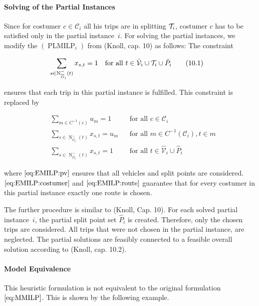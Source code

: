 \paragraph{Solving of the Partial Instances} \parfill

Since for costumer $c\in\mathcal{C}_i$ all his trips are in splitting $\mathcal{T}_i$, costumer $c$ has to be satisfied only in the partial instance~$i$. For solving the partial instances, we modify the $(\operatorname{PLMILP}_i)$ from (Knoll, cap. 10) as follows: The constraint 

\begin{align}
	\sum_{s\in\operatorname{N}_{\overline{G}_i}^-(t)} x_{s,t} = 1 &&& \text{for all } t\in\hat{\mathcal{V}}_i\cup\mathcal{T}_i\cup\hat{P}_i \tag{10.1}
\end{align}

ensures that each trip in this partial instance is fulfilled. This constraint is replaced by

\begin{align}
	& \sum_{m\in C^{-1}(c)} u_m = 1 && \text{for all } c\in\mathcal{C}_i \label{eq:EMILP:costumer} \\
	&\sum_{s\in\operatorname{N}_{\overline{G}_i}^-(t)} x_{s,t} = u_m && \text{for all } m\in C^{-1}\left(\mathcal{C}_i\right), t\in m \label{eq:EMILP:route} \\
	&\sum_{s\in\operatorname{N}_{\overline{G}_i}^-(t)} x_{s,t} = 1 && \text{for all } t\in\hat{\mathcal{V}}_i\cup\hat{P}_i \label{eq:EMILP:pv}
\end{align}

where $\eqref{eq:EMILP:pv}$ ensures that all vehicles and split points are considered. $\eqref{eq:EMILP:costumer}$ and $\eqref{eq:EMILP:route}$ guarantee that for every costumer in this partial instance exactly one route is chosen.

The further procedure is similar to (Knoll, Cap. 10). For each solved partial instance~$i$, the partial split point set $\hat{P}_i$ is created. Therefore, only the chosen trips are considered. All trips that were not chosen in the partial instance, are neglected. The partial solutions are feasibly connected to a feasible overall solution according to (Knoll, cap. 10.2).

\paragraph{Model Equivalence} \parfill

This heuristic formulation is not equivalent to the original formulation $\eqref{eq:MMILP}$. This is shown by the following example.

